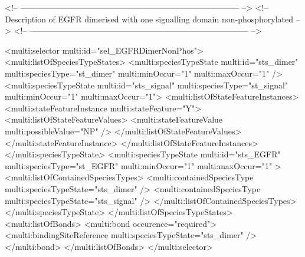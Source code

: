 \begin{example}
<!-- -------------------------------------------------------------------------------- -->
<!-- Description of EGFR dimerised with one signalling domain non-phosphorylated      -->
<!-- -------------------------------------------------------------------------------- -->

      <multi:selector multi:id="sel_EGFRDimerNonPhos">
        <multi:listOfSpeciesTypeStates>
          <multi:speciesTypeState multi:id="sts_dimer" multi:speciesType="st_dimer" 
                                   multi:minOccur="1" multi:maxOccur="1" />
          <multi:speciesTypeState multi:id="sts_signal" multi:speciesType="st_signal" 
                                   multi:minOccur="1" multi:maxOccur="1">
            <multi:listOfStateFeatureInstances>
              <multi:stateFeatureInstance multi:stateFeature="Y">
                <multi:listOfStateFeatureValues>
                  <multi:stateFeatureValue multi:possibleValue="NP" />
                </multi:listOfStateFeatureValues>
              </multi:stateFeatureInstance>
            </multi:listOfStateFeatureInstances>
          </multi:speciesTypeState>
          <multi:speciesTypeState multi:id="sts_EGFR" multi:speciesType="st_EGFR" 
                                   multi:minOccur="1" multi:maxOccur="1" >
            <multi:listOfContainedSpeciesTypes>
              <multi:containedSpeciesType multi:speciesTypeState="sts_dimer" /> 
              <multi:containedSpeciesType multi:speciesTypeState="sts_signal" /> 
            </multi:listOfContainedSpeciesTypes>            
          </multi:speciesTypeState>
        </multi:listOfSpeciesTypeStates>
        <multi:listOfBonds>
          <multi:bond occurence="required">
            <multi:bindingSiteReference multi:speciesTypeState="sts_dimer" />
          </multi:bond>
        </multi:listOfBonds>
      </multi:selector>
\end{example}

